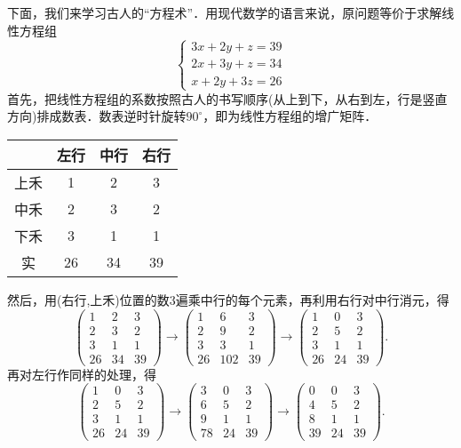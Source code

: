 \documentclass[a4paper,fontset=windows]{ctexbook}
\theoremstyle{definition}
\begin{document}
下面，我们来学习古人的“方程术”．用现代数学的语言来说，原问题等价于求解线性方程组
$$\begin{cases}3x+2y+z=39 \\ 2x+3y+z=34 \\ x+2y+3z=26\end{cases}$$
首先，把线性方程组的系数按照古人的书写顺序(从上到下，从右到左，行是竖直方向)排成数表．数表逆时针旋转$90^\circ$，即为线性方程组的增广矩阵．
\begin{center}\begin{tabular}{c|ccc}
&左行&中行&右行 \\ \hline 上禾&1&2&3 \\ 中禾&2&3&2 \\ 下禾&3&1&1 \\ 实&26&34&39
\end{tabular}\end{center}
然后，用(右行,上禾)位置的数3遍乘中行的每个元素，再利用右行对中行消元，得
$$\begin{pmatrix}1&2&3 \\ 2&3&2 \\ 3&1&1 \\ 26&34&39\end{pmatrix}\to\begin{pmatrix}1&6&3 \\ 2&9&2 \\ 3&3&1 \\ 26&102&39\end{pmatrix}\to\begin{pmatrix}1&0&3 \\ 2&5&2 \\ 3&1&1 \\ 26&24&39\end{pmatrix}.$$
再对左行作同样的处理，得
$$\begin{pmatrix}1&0&3 \\ 2&5&2 \\ 3&1&1 \\ 26&24&39\end{pmatrix}\to\begin{pmatrix}3&0&3 \\ 6&5&2 \\ 9&1&1 \\ 78&24&39\end{pmatrix}\to\begin{pmatrix}0&0&3 \\ 4&5&2 \\ 8&1&1 \\ 39&24&39\end{pmatrix}.$$
\end{document}
